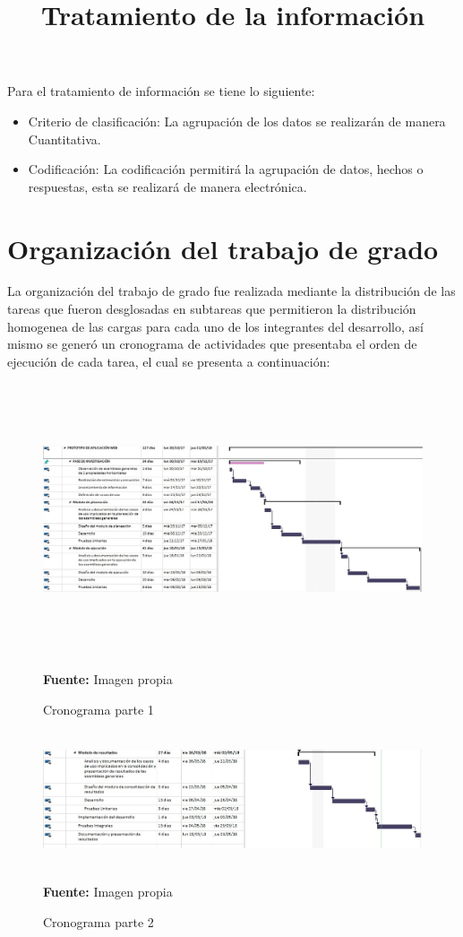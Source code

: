 \title{Tratamiento de la información}

Para el tratamiento de información se tiene lo siguiente:

\begin{itemize}
	\item Criterio de clasificación: La agrupación de los datos se realizarán de manera Cuantitativa.
	
	\item Codificación: La codificación permitirá la agrupación de datos, hechos o respuestas, esta se realizará de manera electrónica.
\end{itemize}

\section{Organización del trabajo de grado}

La organización del trabajo de grado fue realizada mediante la distribución de las tareas que fueron desglosadas en subtareas que permitieron la distribución homogenea de las cargas para cada uno de los integrantes del desarrollo, así mismo se generó un cronograma de actividades que presentaba el orden de ejecución de cada tarea, el cual se presenta a continuación:

\begin{figure}[th!]
	\centering
	\includegraphics[width=16cm,height=8cm]{contexto/proyecto/imgs/Cronograma_parte1.jpg}
	\caption{Cronograma parte 1}{\scriptsize \textbf{Fuente:} Imagen propia}
\end{figure}
\vspace{1cm}
\begin{figure}[th!]
	\centering
	\includegraphics[width=13cm,height=4cm]{contexto/proyecto/imgs/Cronograma_parte2.jpg}
	\caption{Cronograma parte 2}{\scriptsize \textbf{Fuente:} Imagen propia}
\end{figure}

